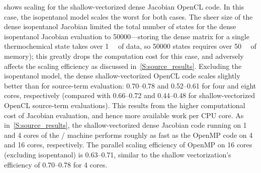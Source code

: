 \documentclass[12pt,number,sort&compress,preprint]{elsarticle}
\begin{document}
 shows scaling for the shallow-vectorized dense Jacobian OpenCL code.
In this case, the isopentanol model scales the worst for both cases.
The sheer size of the dense isopentanol Jacobian limited the total number of states for the dense isopentanol Jacobian evaluation to \num{50000}---storing the dense matrix for a single thermochemical state takes over \SI{1}{\mega\byte} of data, so \num{50000} states requires over \SI{50}{\giga\byte} of memory); this greatly drops the computation cost for this case, and adversely affects the scaling efficiency as discussed in~\cref{S:source_results}.
Excluding the isopentanol model, the dense shallow-vectorized OpenCL code scales slightly better than for source-term evaluation: \numrange{0.70}{0.78} and \numrange{0.52}{0.61} for four and eight cores, respectively (compared with \numrange{0.66}{0.72} and \numrange{0.44}{0.48} for shallow-vectorized OpenCL source-term evaluations).
This results from the higher computational cost of Jacobian evaluation, and hence more available work per CPU core.
As in~\cref{S:source_results}, the shallow-vectorized dense Jacobian code running on \num{1} and \num{4} cores of the \avx/ machine performs roughly as fast as the OpenMP code on \num{4} and \num{16} cores, respectively.
The parallel scaling efficiency of OpenMP on \num{16} cores (excluding isopentanol) is \numrange{0.63}{0.71}, similar to the shallow vectorization's efficiency of \numrange{0.70}{0.78} for \num{4} cores.
\end{document}
